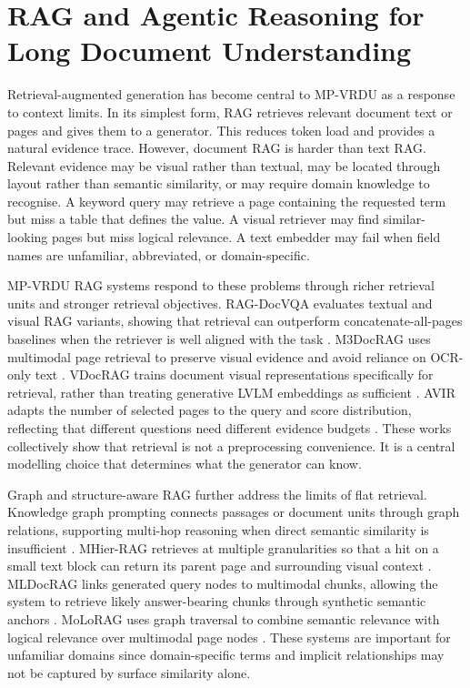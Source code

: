 \documentclass[10pt,a4paper]{article}
\begin{document}
\section{RAG and Agentic Reasoning for Long Document Understanding}

Retrieval-augmented generation has become central to MP-VRDU as a response to context limits. In its simplest form, RAG retrieves relevant document text or pages and gives them to a generator. This reduces token load and provides a natural evidence trace. However, document RAG is harder than text RAG. Relevant evidence may be visual rather than textual, may be located through layout rather than semantic similarity, or may require domain knowledge to recognise. A keyword query may retrieve a page containing the requested term but miss a table that defines the value. A visual retriever may find similar-looking pages but miss logical relevance. A text embedder may fail when field names are unfamiliar, abbreviated, or domain-specific.

MP-VRDU RAG systems respond to these problems through richer retrieval units and stronger retrieval objectives. RAG-DocVQA evaluates textual and visual RAG variants, showing that retrieval can outperform concatenate-all-pages baselines when the retriever is well aligned with the task \cite{lopez2025enhancing}. M3DocRAG uses multimodal page retrieval to preserve visual evidence and avoid reliance on OCR-only text \cite{cho2024m3docrag}. VDocRAG trains document visual representations specifically for retrieval, rather than treating generative LVLM embeddings as sufficient \cite{tanaka2025vdocrag}. AVIR adapts the number of selected pages to the query and score distribution, reflecting that different questions need different evidence budgets \cite{li2025avir}. These works collectively show that retrieval is not a preprocessing convenience. It is a central modelling choice that determines what the generator can know.

Graph and structure-aware RAG further address the limits of flat retrieval. Knowledge graph prompting connects passages or document units through graph relations, supporting multi-hop reasoning when direct semantic similarity is insufficient \cite{wang2024knowledge}. MHier-RAG retrieves at multiple granularities so that a hit on a small text block can return its parent page and surrounding visual context \cite{gong2025mhier}. MLDocRAG links generated query nodes to multimodal chunks, allowing the system to retrieve likely answer-bearing chunks through synthetic semantic anchors \cite{zhang2026mldocrag}. MoLoRAG uses graph traversal to combine semantic relevance with logical relevance over multimodal page nodes \cite{wu2025molorag}. These systems are important for unfamiliar domains since domain-specific terms and implicit relationships may not be captured by surface similarity alone.
\end{document}
